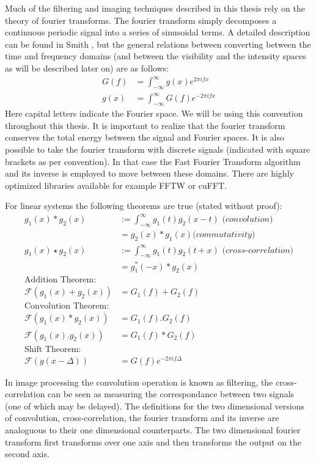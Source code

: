 Much of the filtering and imaging techniques described in this thesis rely on the theory of fourier transforms. The fourier transform simply decomposes a continuous periodic signal into a series of sinusoidal terms. A detailed description 
can be found in Smith \cite[ch 8-12,31]{smith1997scientist}, but the general relations between converting between the time and frequency domains (and between the visibility and the intensity spaces as will be described later on) are as follows:
\begin{equation*}
  \begin{split}
    G(f) &= \int_{-\infty}^{\infty}g(x)e^{2\pi ifx}\\
    g(x) &= \int_{-\infty}^{\infty}G(f)e^{-2\pi ifx}
  \end{split}
\end{equation*}
Here capital letters indicate the Fourier space. We will be using this convention throughout this thesis. It is important to realize that the fourier transform conserves the total energy between the signal and Fourier spaces. It is 
also possible to take the fourier transform with discrete signals (indicated with square brackets as per convention). In that case the Fast Fourier Transform algorithm and its inverse is employed to move between these domains. There are 
highly optimized libraries available for example FFTW or cuFFT.

For linear systems the following theorems are true (stated without proof):
\begin{equation*}
  \begin{split}
    g_1(x)*g_2(x) &:= \int_{-\infty}^{\infty}g_1(t)g_2(x-t)\textit{ (convolution)}\\
    &=g_2(x)*g_1(x)\textit{(commutativity)}\\
    g_1(x)\star g_2(x) &:= \int_{-\infty}^{\infty}g_1(t)g_2(t+x)\textit{ (cross-correlation)}\\
    &=g_1^*(-x)*g_2(x)\\
    \text{Addition Theorem:}\\
    \mathcal{F}(g_1(x)+g_2(x)) &= G_1(f)+G_2(f)\\
    \text{Convolution Theorem:}\\
    \mathcal{F}(g_1(x)*g_2(x)) &=G_1(f).G_2(f)\\
    \mathcal{F}(g_1(x).g_2(x)) &=G_1(f)*G_2(f)\\
    \text{Shift Theorem:}\\
    \mathcal{F}(g(x-\Delta))&=G(f)e^{-2\pi if\Delta}
  \end{split}
\end{equation*}

In image processing the convolution operation is known as filtering, the cross-correlation can be seen as measuring the correspondance between two signals (one of which may be delayed). The definitions for the two dimensional 
versions of convolution, cross-correlation, the fourier transform and its inverse are analoguous to their one dimensional counterparts. The two dimensional fourier transform first transforms over one axis and then 
transforms the output on the second axis.